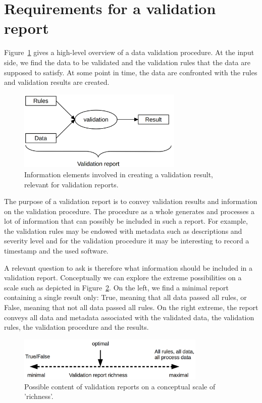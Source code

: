 
\section{Requirements for a validation report}
\label{sect:demands}
Figure~\ref{fig:validation} gives a high-level overview of a data validation
procedure. At the input side, we find the data to be validated and the
validation rules that the data are supposed to satisfy. At some point in time,
the data are confronted with the rules and validation results are created. 
%
\begin{figure}[t]
\centering
\includegraphics[width=0.7\textwidth]{fig/validation.png}
\caption{Information elements involved in creating a validation result, relevant for validation reports.}
\label{fig:validation}
\end{figure}

The purpose of a validation report is to convey validation results and
information on the validation procedure. The procedure as a whole generates and
processes a lot of information that can possibly be included in such a report.
For example, the validation rules may be endowed with metadata such as
descriptions and severity level and for the validation procedure it may be
interesting to record a timestamp and the used software.

A relevant question to ask is therefore what information should be included in
a validation report. Conceptually we can explore the extreme possibilities on a
scale such as depicted in Figure~\ref{fig:richness}. On the left, we find a minimal report
containing a single result only: True, meaning that all data passed all rules,
or False, meaning that not all data passed all rules. On the right extreme, the
report conveys all data and metadata associated with the validated data, the
validation rules, the validation procedure and the results.
%
\begin{figure}
\centering
\includegraphics[width=0.8\textwidth]{fig/richness.png}
\caption{Possible content of validation reports on a conceptual scale of 'richness'.}
\label{fig:richness}
\end{figure}



